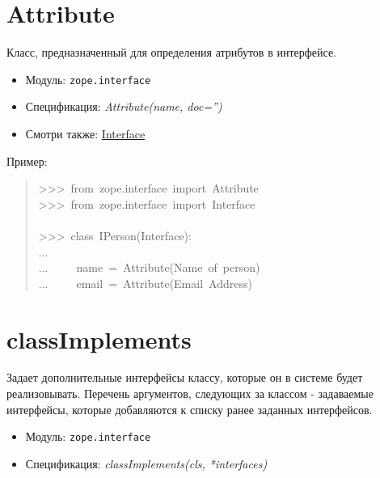 \documentclass[14pt,a4paper,openany,twoside,final]{extbook}
\providecommand*{\DUroletitlereference}[1]{\textsl{#1}}
\begin{document}
\section*{Attribute%
  \label{attribute}%
}

Класс, предназначенный для определения атрибутов в интерфейсе.

\begin{itemize}

\item Модуль: \texttt{zope.interface}

\item Спецификация: \DUroletitlereference{Attribute(name, doc='')}

\item Смотри также: \hyperref[interface]{Interface}

\end{itemize}

Пример:

\begin{quote}{\ttfamily \raggedright \noindent
>{}>{}>~from~zope.interface~import~Attribute\\
>{}>{}>~from~zope.interface~import~Interface\\
~\\
>{}>{}>~class~IPerson(Interface):\\
...\\
...~~~~~name~=~Attribute(\textquotedbl{}Name~of~person\textquotedbl{})\\
...~~~~~email~=~Attribute(\textquotedbl{}Email~Address\textquotedbl{})
}
\end{quote}


\section*{classImplements%
  \label{classimplements}%
}

Задает дополнительные интерфейсы классу, которые он в системе будет
реализовывать.  Перечень аргументов, следующих за классом -
задаваемые интерфейсы, которые добавляются к списку ранее
заданных интерфейсов.

\begin{itemize}

\item Модуль: \texttt{zope.interface}

\item Спецификация: \DUroletitlereference{classImplements(cls, *interfaces)}

\end{itemize}
\end{document}
